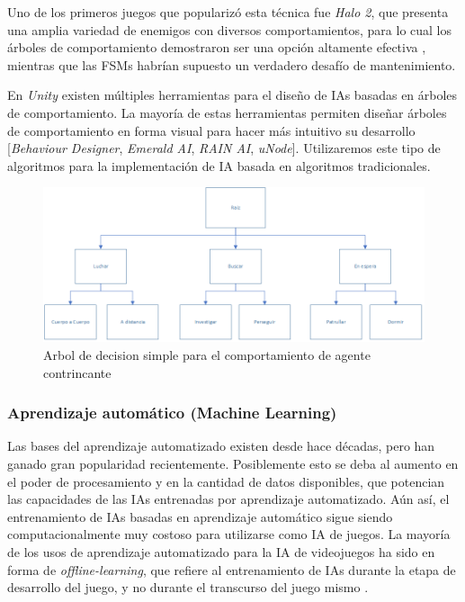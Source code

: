 \documentclass[a4paper]{article}
\begin{document}
Uno de los primeros juegos que popularizó esta técnica fue \textit{Halo 2}, que presenta una amplia  variedad de enemigos con diversos comportamientos, para lo cual los árboles de comportamiento demostraron ser una opción altamente efectiva \cite{implementation_of_behavior_tree_in_halo_2}, mientras que las FSMs habrían supuesto un verdadero desafío de mantenimiento.

En \textit{Unity} existen múltiples herramientas para el diseño de IAs basadas en árboles de comportamiento. La mayoría de estas herramientas permiten diseñar árboles de comportamiento en forma visual para hacer más intuitivo su desarrollo [\textit{Behaviour Designer}, \textit{Emerald AI}, \textit{RAIN AI}, \textit{uNode}]. Utilizaremos este tipo de algoritmos para la implementación de IA basada en algoritmos tradicionales.

\begin{figure}[ht]
    \centering
    \includegraphics[width=1\textwidth]{./images/behaviour-tree.png}
    \caption{Arbol de decision simple para el comportamiento de agente contrincante}
    \label{fig:bt}
\end{figure}

\subsubsection{Aprendizaje automático (Machine Learning)}

Las bases del aprendizaje automatizado existen desde hace décadas, pero han ganado gran popularidad recientemente. Posiblemente esto se deba al aumento en el poder de procesamiento y en la cantidad de datos disponibles, que potencian las capacidades de las IAs entrenadas por aprendizaje automatizado. Aún así, el entrenamiento de IAs basadas en aprendizaje automático sigue siendo computacionalmente muy costoso para utilizarse como IA de juegos. La mayoría de los usos de aprendizaje automatizado para la IA de videojuegos ha sido en forma de \textit{offline-learning}, que refiere al entrenamiento de IAs durante la etapa de desarrollo del juego, y no durante el transcurso del juego mismo \cite{machine_learning_in_digital_games:_a_survey}.
\end{document}
